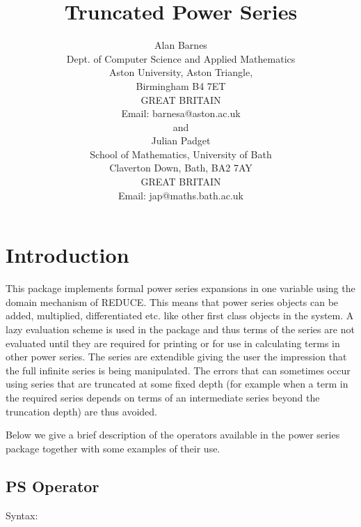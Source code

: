 \title{Truncated Power Series}
\date{}
\author{Alan Barnes \\
Dept. of Computer Science and Applied Mathematics \\
Aston University, Aston Triangle, \\
Birmingham B4 7ET \\ GREAT BRITAIN \\
Email: barnesa@aston.ac.uk \\[0.1in]
and \\[0.1in]
Julian Padget \\
School of Mathematics, University of Bath \\
Claverton Down, Bath, BA2 7AY \\
GREAT BRITAIN \\
Email: jap@maths.bath.ac.uk}

\maketitle
{} 
 
\section{Introduction}
This package implements formal power series expansions in one
variable using the domain mechanism of REDUCE. This means that power
series objects can be added, multiplied, differentiated etc. like other
first class objects in the system. A lazy evaluation scheme is used in
the package and thus terms of the series are not evaluated until they
are required for printing or for use in calculating terms in other
power series. The series are extendible giving the user the impression
that the full infinite series is being manipulated.  The errors that
can sometimes occur using series that are truncated at some fixed depth
(for example when a term in the required series depends on terms of an
intermediate series beyond the truncation depth) are thus avoided.

Below we give a brief description of the operators available in the
power series package together with some examples of their use.

\subsection{PS Operator}

Syntax:

